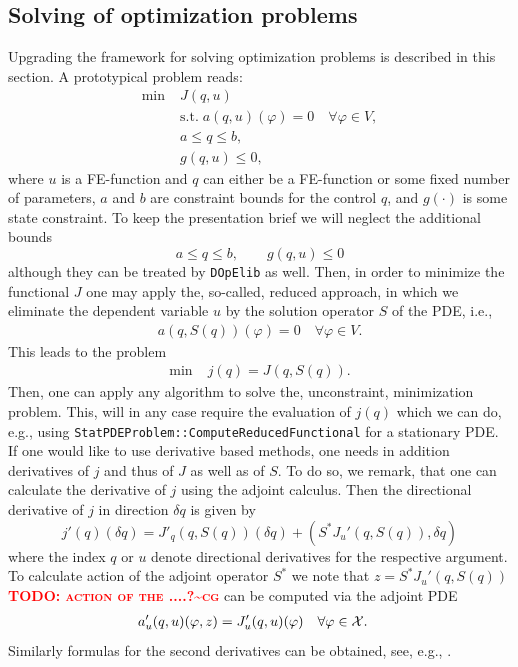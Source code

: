 \documentclass[prodmode,acmtoms]{acmsmall}
\numberwithin{equation}{section}
\renewcommand{\phi}{\varphi}
\newcommand{\dope}{\texttt{DOpElib}}
\newcommand{\todocg}[1]{\textbf{\textsc{\textcolor{red}{TODO: #1\textasciitilde cg}}}}
\begin{document}
\subsection{Solving of optimization problems}\label{sec:opt}
Upgrading the framework for solving optimization problems
is described in this section. A prototypical problem reads:
\begin{align*}
\min\;&J(q,u) \\
  &\text{s.t.}\; a(q,u)(\phi) = 0 \quad \forall \phi\in V,\\
  &a \le q \le b,\\
  &g(q,u) \le 0,  
\end{align*}
where $u$ is a FE-function and $q$ can either be a FE-function or some 
fixed number of parameters, $a$ and $b$ are constraint bounds for the control $q$,
and $g(\cdot)$ is some state constraint.
To keep the presentation brief we will neglect the additional bounds
\[
a \le q \le b,\qquad g(q,u) \le 0
\]
although they can be treated by \dope{} as well.
Then, in order to minimize the functional $J$ one may apply the, so-called, 
reduced approach, in which we eliminate the dependent variable $u$ by the solution 
operator $S$ of the PDE, i.e., 
\begin{align*}
a(q,S(q))(\phi) = 0 \quad \forall \phi\in V. 
\end{align*}
This leads to the problem
\begin{align*}
\min\;&j(q) = J(q,S(q)). 
\end{align*}
Then, one can apply any algorithm to solve the, unconstraint, minimization 
problem. This, will in any case require the evaluation of $j(q)$ which 
we can do, e.g., using \texttt{StatPDEProblem::ComputeReducedFunctional} for 
a stationary PDE. If one would like to use derivative based methods, one 
needs in addition derivatives of $j$ and thus of $J$ as well as of $S$. 
To do so, we remark, that one can calculate the derivative of 
$j$ using the adjoint calculus. Then the directional derivative 
of $j$ in direction $\delta q$ is given by
\[
j'(q)(\delta q) = J'_q(q,S(q))(\delta q) + (S^* J_u'(q,S(q)),\delta q)
\]
where the index $q$ or $u$ denote directional derivatives for the 
respective argument. To calculate action of the adjoint operator $S^*$ 
we note that $z =  S^* J_u'(q,S(q))$ \todocg{action of the ....?}
can be computed via the adjoint PDE
\begin{equation}
  \label{opt_KKT_system}
  \begin{aligned}
    a_{u}'(q,u)(\phi , z) &= J'_{u}(q,u)(\phi) & \forall \phi&\in {\cal X}.
  \end{aligned}
\end{equation}
Similarly formulas for the second derivatives can be obtained, see, e.g., 
\cite{BeMeVe06}.
\end{document}
